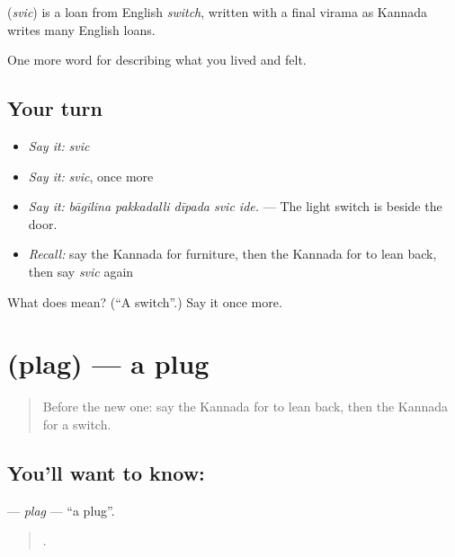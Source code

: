\begin{cousinweb}
\textbf{} (\emph{svic}) is a loan from English \emph{switch}, written with a final virama as Kannada writes many English loans.
\end{cousinweb}

\begin{grammarlens}[title={What you've built}]
One more word for describing what you lived and felt.
\end{grammarlens}

\subsection*{Your turn}
\begin{itemize}
\raggedright
  \item \emph{Say it:} \emph{svic}
  \item \emph{Say it:} \emph{svic}, once more
  \item \emph{Say it:} \emph{bāgilina pakkadalli dīpada svic ide.} — The light switch is beside the door.
  \item \emph{Recall:} say the Kannada for furniture, then the Kannada for to lean back, then say \emph{svic} again
\end{itemize}

\begin{tcolorbox}[breakable,colback=teal!4,colframe=teal!35!black,title={Before you move on}]
What does  mean? (\textquotedblleft{}A switch\textquotedblright{}.) Say it once more.
\end{tcolorbox}
\section[\texorpdfstring{\kn{ಪ್ಲಗ್} (plag)}{ಪ್ಲಗ್ (plag)}]{ (plag) — a plug}

\label{lesson:KA-C544-plag}



\begin{quote}
Before the new one: say the Kannada for to lean back, then the Kannada for a switch.
\end{quote}

\subsection*{You'll want to know: }
\textbf{} — \emph{plag} — \textquotedblleft{}a plug\textquotedblright{}.

\begin{quote}
   .
\end{quote}

